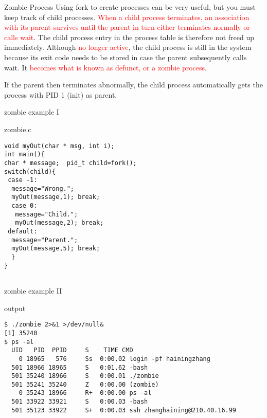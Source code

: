\documentclass{beamer}
\begin{document}
\begin{frame}{Zombie Process}
Using fork to create processes can be very useful, but you must keep track of child processes. \textcolor{red}{When a child process terminates, an association with its parent survives until the parent in turn either terminates normally or calls wait}. The child process entry in the process table is therefore not freed up immediately. Although \textcolor{red}{no longer active}, the child process is still in the system because its exit code needs to be stored in case the parent subsequently calls wait. It \textcolor{red}{becomes what is known as defunct, or a zombie process}.

If the parent then terminates abnormally, the child process automatically gets the process with PID 1 (init) as parent.
\end{frame}
\begin{frame}[fragile]{zombie example I}
\begin{block}{zombie.c}
\begin{verbatim}
void myOut(char * msg, int i);
int main(){
char * message;  pid_t child=fork();
switch(child){
 case -1:
  message="Wrong.";
  myOut(message,1); break;
  case 0:
   message="Child.";
   myOut(message,2); break;
 default:
  message="Parent."; 
  myOut(message,5); break;
  }
}


\end{verbatim}
\end{block}
\end{frame}
\begin{frame}[fragile]{zombie example II}
\begin{block}{output}
\begin{verbatim}$ ./zombie 2>&1 >/dev/null&
[1] 35240
$ ps -al
  UID   PID  PPID     S    TIME CMD
    0 18965   576     Ss  0:00.02 login -pf hainingzhang
  501 18966 18965     S   0:01.62 -bash
  501 35240 18966     S   0:00.01 ./zombie
  501 35241 35240     Z   0:00.00 (zombie)
    0 35243 18966     R+  0:00.00 ps -al
  501 33922 33921     S   0:00.03 -bash
  501 35123 33922     S+  0:00.03 ssh zhanghaining@210.40.16.99
  \end{verbatim}
\end{block}
\end{frame}
\end{document}
